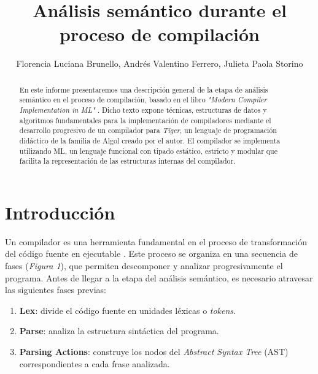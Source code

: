 \documentclass[runningheads]{llncs}
\begin{document}
\title{Análisis semántico durante el proceso de compilación}

\author{
    Florencia Luciana Brunello, 
    Andrés Valentino Ferrero, 
    Julieta Paola Storino
}



\maketitle

\begin{abstract}
En este informe presentaremos una descripción general de la etapa de análisis semántico en el proceso de compilación, basado en el libro \textit{"Modern Compiler Implementation in ML"} \cite{1}. Dicho texto expone técnicas, estructuras de datos y algoritmos fundamentales para la implementación de compiladores mediante el desarrollo progresivo de un compilador para \textit{Tiger}, un lenguaje de programación didáctico de la familia de Algol creado por el autor. El compilador se implementa utilizando ML, un lenguaje funcional con tipado estático, estricto y modular que facilita la representación de las estructuras internas del compilador.
\end{abstract}

\section{Introducción}
Un compilador es una herramienta fundamental en el proceso de transformación del código fuente en ejecutable \cite{2}. Este proceso se organiza en una secuencia de fases (\textit{Figura 1}), que permiten descomponer y analizar progresivamente el programa. Antes de llegar a la etapa del análisis semántico, es necesario atravesar las siguientes fases previas:
\begin{enumerate}
    \item \textbf{Lex}: divide el código fuente en unidades léxicas o \textit{tokens}.
    \item \textbf{Parse}: analiza la estructura sintáctica del programa.
    \item \textbf{Parsing Actions}: construye los nodos del \textit{Abstract Syntax Tree} (AST) correspondientes a cada frase analizada.
\end{enumerate}
\end{document}
